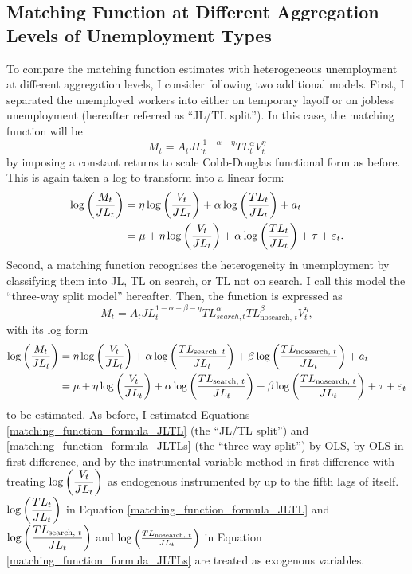 \documentclass[a4paper, 11pt, tikz]{article}
\begin{document}
\subsection{Matching Function at Different Aggregation Levels of Unemployment Types}
To compare the matching function estimates with heterogeneous unemployment at different aggregation levels, I consider following two additional models.
First, I separated the unemployed workers into either on temporary layoff or on jobless unemployment (hereafter referred as ``JL/TL split'').
In this case, the matching function will be
\begin{equation}
  M_t = A_tJL_t^{1 - \alpha - \eta}TL_t^\alpha V_t^\eta
\end{equation}
by imposing a constant returns to scale Cobb-Douglas functional form as before.
This is again taken a log to transform into a linear form:
\begin{align}
  \log\qty(\frac{M_t}{JL_t}) &= \eta\log\qty(\frac{V_t}{JL_t}) + \alpha\log\qty(\frac{TL_t}{JL_t}) + a_t \\
                             &= \mu + \eta\log\qty(\frac{V_t}{JL_t}) + \alpha\log\qty(\frac{TL_t}{JL_t}) + \tau + \varepsilon_t. \label{matching_function_formula_JLTL}
\end{align}
Second, a matching function recognises the heterogeneity in unemployment by classifying them into JL, TL on search, or TL not on search.
I call this model the ``three-way split model'' hereafter.
Then, the function is expressed as
\begin{equation}
  M_t = A_tJL_t^{1 - \alpha - \beta - \eta}TL_{search,t}^\alpha TL_{\text{nosearch, }t}^\beta V_t^\eta,
\end{equation}
with its log form
\begin{align}
  \log\qty(\frac{M_t}{JL_t}) &= \eta\log\qty(\frac{V_t}{JL_t}) + \alpha\log\qty(\frac{TL_{\text{search, }t}}{JL_t}) + \beta\log\qty(\frac{TL_{\text{nosearch, }t}}{JL_t}) + a_t \\
                             &= \mu + \eta\log\qty(\frac{V_t}{JL_t}) + \alpha\log\qty(\frac{TL_{\text{search, }t}}{JL_t}) + \beta\log\qty(\frac{TL_{\text{nosearch, }t}}{JL_t}) + \tau + \varepsilon_t \label{matching_function_formula_JLTLs}
\end{align}
to be estimated.
As before, I estimated Equations \ref{matching_function_formula_JLTL} (the ``JL/TL split'') and \ref{matching_function_formula_JLTLs} (the ``three-way split'') by OLS, by OLS in first difference, and by the instrumental variable method in first difference with treating $\log\qty(\dfrac{V_t}{JL_t})$ as endogenous instrumented by up to the fifth lags of itself.
$\log\qty(\dfrac{TL_t}{JL_t})$ in Equation \ref{matching_function_formula_JLTL} and $\log\qty(\dfrac{TL_{\text{search, }t}}{JL_t})$ and $\log\qty(\frac{TL_{\text{nosearch, }t}}{JL_t})$ in Equation \ref{matching_function_formula_JLTLs} are treated as exogenous variables.
\end{document}
